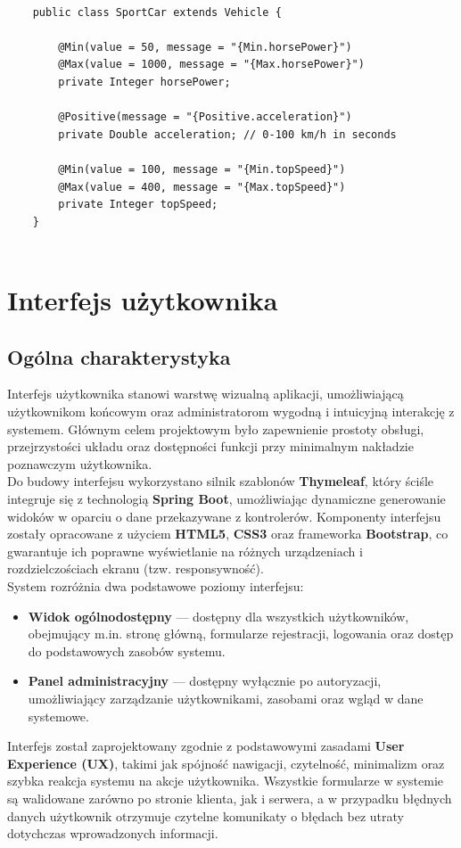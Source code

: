 \documentclass[12pt]{article}
\begin{document}
\begin{lstlisting}[style=customJava, caption=Klasa dziedzicząca SportCar]

	public class SportCar extends Vehicle {
		
		@Min(value = 50, message = "{Min.horsePower}")
		@Max(value = 1000, message = "{Max.horsePower}")
		private Integer horsePower;
		
		@Positive(message = "{Positive.acceleration}")
		private Double acceleration; // 0-100 km/h in seconds
		
		@Min(value = 100, message = "{Min.topSpeed}")
		@Max(value = 400, message = "{Max.topSpeed}")
		private Integer topSpeed;
	}
	
\end{lstlisting}	
	
\section{Interfejs użytkownika}
\subsection{Ogólna charakterystyka}
	
	Interfejs użytkownika stanowi warstwę wizualną aplikacji, umożliwiającą użytkownikom końcowym oraz administratorom wygodną i intuicyjną interakcję z systemem. Głównym celem projektowym było zapewnienie prostoty obsługi, przejrzystości układu oraz dostępności funkcji przy minimalnym nakładzie poznawczym użytkownika.\\
	Do budowy interfejsu wykorzystano silnik szablonów \textbf{Thymeleaf}, który ściśle integruje się z technologią \textbf{Spring Boot}, umożliwiając dynamiczne generowanie widoków w oparciu o dane przekazywane z kontrolerów. Komponenty interfejsu zostały opracowane z użyciem \textbf{HTML5}, \textbf{CSS3} oraz frameworka \textbf{Bootstrap}, co gwarantuje ich poprawne wyświetlanie na różnych urządzeniach i rozdzielczościach ekranu (tzw. responsywność).\\
	System rozróżnia dwa podstawowe poziomy interfejsu:
	\begin{itemize}
		\item \textbf{Widok ogólnodostępny} --- dostępny dla wszystkich użytkowników, obejmujący m.in. stronę główną, formularze rejestracji, logowania oraz dostęp do podstawowych zasobów systemu.
		\item \textbf{Panel administracyjny} --- dostępny wyłącznie po autoryzacji, umożliwiający zarządzanie użytkownikami, zasobami oraz wgląd w dane systemowe.
	\end{itemize}
	Interfejs został zaprojektowany zgodnie z podstawowymi zasadami \textbf{User Experience (UX)}, takimi jak spójność nawigacji, czytelność, minimalizm oraz szybka reakcja systemu na akcje użytkownika. Wszystkie formularze w systemie są walidowane zarówno po stronie klienta, jak i serwera, a w przypadku błędnych danych użytkownik otrzymuje czytelne komunikaty o błędach bez utraty dotychczas wprowadzonych informacji.
	
\end{document}
